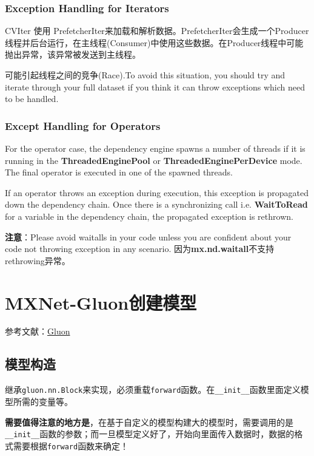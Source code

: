 \subsubsection{Exception Handling for Iterators}

CVIter 使用 PrefetcherIter来加载和解析数据。PrefetcherIter会生成一个Producer线程并后台运行，在主线程(Consumer)中使用这些数据。在Producer线程中可能抛出异常，该异常被发送到主线程。


可能引起线程之间的竞争(Race).To avoid this situation, you should try and iterate through your full dataset if you think it can throw exceptions which need to be handled.

\subsubsection{Except Handling for Operators}

For the operator case, the dependency engine spawns a number of threads if it is running in the \textbf{ThreadedEnginePool} or \textbf{ThreadedEnginePerDevice} mode. The final operator is executed in one of the spawned threads.

If an operator throws an exception during execution, this exception is propagated down the dependency chain. Once there is a synchronizing call i.e. \textbf{WaitToRead} for a variable in the dependency chain, the propagated exception is rethrown.


\textbf{注意}：Please avoid waitalls in your code unless you are confident about your code not throwing exception in any scenario. 因为\textbf{mx.nd.waitall}不支持rethrowing异常。

\section{MXNet-Gluon创建模型}

参考文献：\href{zh.gluon.ai}{Gluon}

\subsection{模型构造}

继承\verb|gluon.nn.Block|来实现，必须重载\verb|forward|函数。在\verb|__init__|函数里面定义模型所需的变量等。

\textbf{需要值得注意的地方是}，在基于自定义的模型构建大的模型时，需要调用的是\verb|__init__|函数的参数；而一旦模型定义好了，开始向里面传入数据时，数据的格式需要根据\verb|forward|函数来确定！

